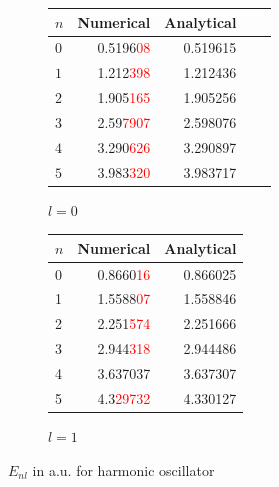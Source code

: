 \documentclass[a4paper, 11pt]{article}
\begin{document}
\begin{figure}[h!]
\centering
\begin{subfigure}{.4\textwidth}
\begin{tabular}{lrrrr}
\toprule
{$n$} &     {Numerical} &     {Analytical}   \\
\midrule
$ 0 $&   0.5196\textcolor{red}{08} &    0.519615 \\
$ 1 $ &   1.212\textcolor{red}{398} &    1.212436 \\
$ 2$ &   1.905\textcolor{red}{165} &    1.905256 \\
$ 3 $ &   2.59\textcolor{red}{7907} &    2.598076 \\
$ 4$ &   3.290\textcolor{red}{626} &    3.290897 \\
$ 5 $ &   3.983\textcolor{red}{320} &    3.983717 \\
\bottomrule
\end{tabular}
\caption{$l=0$}
\end{subfigure}%
\begin{subfigure}{.45\textwidth}
\begin{tabular}{lrr}
\toprule
{$n$} &  Numerical &  Analytical \\
\midrule
0 &   0.8660\textcolor{red}{16} &    0.866025 \\
1 &   1.5588\textcolor{red}{07} &    1.558846 \\
2 &   2.251\textcolor{red}{574} &    2.251666 \\
3 &   2.944\textcolor{red}{318} &    2.944486 \\
4 &   3.637037 &    3.637307 \\
5 &   4.3\textcolor{red}{29732} &    4.330127 \\
\bottomrule
\end{tabular}
\caption{$l=1$}
\end{subfigure}
\caption{$E_{nl}$ in a.u. for harmonic oscillator }
\label{table:Harm_osc}
\end{figure}
\end{document}
